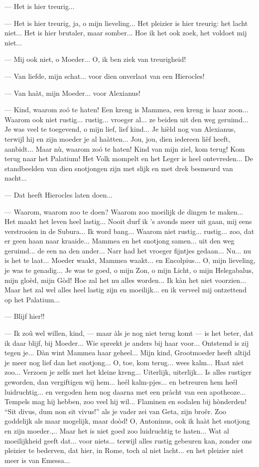 \documentclass[a4paper, 12pt, oneside, dutch]{article}
\begin{document}
--- Het is hier treurig...

--- Het is hier treurig, ja, o mijn lieveling... Het pleizier is hier treurig: het lacht niet... Het is hier brutaler, maar somber... Hoe ik het ook zoek, het voldoet mij niet...

--- Mij ook niet, o Moeder... O, ik ben ziek van treurigheid!

--- Van liefde, mijn schat... voor dien onverlaat van een Hierocles!

--- Van haàt, mijn Moeder... voor Alexianus!

--- Kind, waarom zoó te haten! Een kreng is Mammea, een kreng is haar zoon... Waarom ook niet rustig... rustig... vroeger al... ze beiden uit den weg geruimd... Je was veel te toegevend, o mijn lief, lief kind... Je hièld nog van Alexianus, terwijl hij en zijn moeder je al haàtten... Jou, jou, dien iedereen lièf heeft, aanbidt... Maar nù, waarom zoó te haten! Kind van mijn ziel, kom terug! Kom terug naar het Palatium! Het Volk mompelt en het Leger is heel ontevreden... De standbeelden van dien snotjongen zijn met slijk en met drek besmeurd van nacht...

--- Dat heeft Hierocles laten doen...

--- Waarom, waarom zoo te doen? Waarom zoo moeilijk de dingen te maken... Het maakt het leven heel lastig... Nooit durf ik 's avonds meer uit gaan, mij eens verstrooien in de Subura... Ik word bang... Waarom niet rustig... rustig... zoo, dat er geen haan naar kraaide... Mammea en het snotjong samen... uit den weg geruimd... de een na den ander... Narr had het vroeger fijntjes gedaan... Nu... nu is het te laat... Moeder waakt, Mammea waakt... en Encolpius... O, mijn lieveling, je was te genadig... Je was te goed, o mijn Zon, o mijn Licht, o mijn Helegabalus, mijn gloèd, mijn Gòd! Hoe zal het nu alles worden... Ik kàn het niet voorzien... Maar het zal wel alles heel lastig zijn en moeilijk... en ik verveel mij ontzettend op het Palatium...

--- Blijf hier!!

--- Ik zoû wel willen, kind, --- maar àls je nog niet terug komt --- is het beter, dat ik daar blijf, bij Moeder... Wie spreekt je anders bij haar voor... Ontstemd is zij tegen je... Dàn wint Mammea haar geheel... Mijn kind, Grootmoeder heeft altijd je meer nog lief dan het snotjong... O, toe, kom terug... wees kalm... Haat niet zoo... Verzoen je zelfs met het kleine kreng... Uiterlijk, uiterlijk... Is alles rustiger geworden, dan vergiftigen wij hem... heél kalm-pjes... en betreuren hem heél luidruchtig... en vergoden hem nog daarna met een pràcht van een apotheoze... Tempels mag hij hebben, zoo veel hij wil... Flaminen en sodalen bij hònderden! "`Sit divus, dum non sit vivus!"' als je vader zei van Geta, zijn broêr. Zoo goddelijk als maar mogelijk, maar doòd! O, Antoninus, ook ik haàt het snotjong en zijn moeder.,.. Maar het is niet goed zoo luidruchtig te haten... Wat al moeilijkheid geeft dat... voor niets... terwijl alles rustig gebeuren kan, zonder ons pleizier te bederven, dat hier, in Rome, toch al niet lacht... en het pleizier niet meer is van Emessa...
\end{document}
